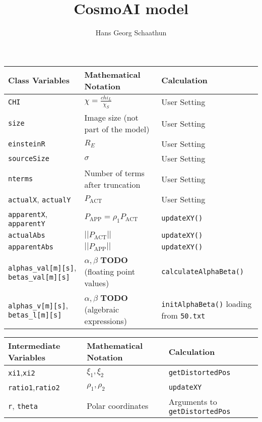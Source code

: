 \documentclass{scrartcl}
\title{CosmoAI model}
\author{Hans Georg Schaathun}
\begin{document}
\maketitle

\begin{center}
\begin{tabular}{l|l|l}
\hline
  Class Variables & Mathematical Notation & Calculation \\
\hline
\hline
   \texttt{CHI}       & $\chi=\frac{chi_L}{\chi_S}$      & User Setting \\
   \texttt{size}      & Image size (not part of the model) & User Setting \\
   \texttt{einsteinR} & $R_E$                              & User Setting \\
   \texttt{sourceSize} & $\sigma$                          & User Setting \\
   \texttt{nterms}    & Number of terms after truncation    & User Setting \\
   \texttt{actualX}, \texttt{actualY} & $P_{\textrm{ACT}}$  & User Setting\\
   \texttt{apparentX}, \texttt{apparentY} 
         & $P_{\textrm{APP}}=\rho_1P_{\textrm{ACT}}$ & \texttt{updateXY()} \\
   \texttt{actualAbs} & $||P_{\textrm{ACT}}||$ & \texttt{updateXY()} \\
   \texttt{apparentAbs} & $||P_{\textrm{APP}}||$ & \texttt{updateXY()} \\
   \texttt{alphas\_val[m][s]},
   \texttt{betas\_val[m][s]}  & $\alpha,\beta$ \textbf{TODO}
        (floating point values)
        & \texttt{calculateAlphaBeta()} \\
   \texttt{alphas\_v[m][s]},
   \texttt{betas\_l[m][s]}  & $\alpha,\beta$ \textbf{TODO}
        (algebraic expressions)
        & \texttt{initAlphaBeta()} loading from \texttt{50.txt} \\
\hline
\end{tabular}
\end{center}

\begin{center}
\begin{tabular}{l|l|l}
\hline
   Intermediate Variables & Mathematical Notation & Calculation \\
\hline
\hline
   \texttt{xi1},\texttt{xi2}       & $\xi_1,\xi_2$     & \texttt{getDistortedPos} \\
   \texttt{ratio1},\texttt{ratio2} & $\rho_1,\rho_2$   & \texttt{updateXY}        \\
   \texttt{r}, \texttt{theta} & Polar coordinates &
      Arguments to \texttt{getDistortedPos} \\
\hline
\end{tabular}
\end{center}
\end{document}
